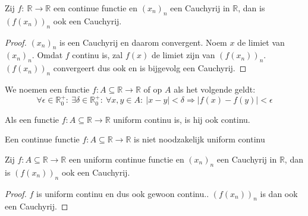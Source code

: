 \documentclass[main.tex]{subfiles}
\begin{document}
\begin{st}
  \label{st:continue-functie-behoudt-cauchy}
  Zij $f:\ \mathbb{R} \rightarrow \mathbb{R}$ een continue functie en $(x_{n})_{n}$ een Cauchyrij in $\mathbb{R}$, dan is $(f(x_{n}))_{n}$ ook een Cauchyrij.

  \begin{proof}
    $(x_{n})_{n}$ is een Cauchyrij en daarom convergent.
    Noem $x$ de limiet van $(x_{n})_{n}$.
    Omdat $f$ continu is, zal $f(x)$ de limiet zijn van $(f(x_{n}))_{n}$.
    $(f(x_{n}))_{n}$ convergeert dus ook en is bijgevolg een Cauchyrij.
  \end{proof}
\end{st}

\begin{de}
  We noemen een functie $f: A \subseteq \mathbb{R} \rightarrow \mathbb{R}$  of  op $A$ als het volgende geldt:
  \[ \forall \epsilon \in \mathbb{R}_{0}^{+}:\ \exists \delta \in \mathbb{R}_{0}^{+}:\ \forall x,y \in A:\ |x-y| < \delta \Rightarrow |f(x)-f(y)| < \epsilon \]
\end{de}

\begin{st}
  \label{st:uniform-continu-dan-ook-gewoon-continu}
  Als een functie $f: A \subseteq \mathbb{R} \rightarrow \mathbb{R}$ uniform continu is, is hij ook continu.
\end{st}

\begin{tvb}
  Een continue functie $f: A \subseteq \mathbb{R} \rightarrow \mathbb{R}$ is niet noodzakelijk uniform continu
\end{tvb}

\begin{pr}
  \label{pr:uniform-continue-functie-behoudt-cauchy}
  Zij $f: A \subseteq \mathbb{R} \rightarrow \mathbb{R}$ een uniform continue functie en $(x_{n})_{n}$ een Cauchyrij in $\mathbb{R}$, dan is $(f(x_{n}))_{n}$ ook een Cauchyrij.

  \begin{proof}
    $f$ is uniform continu en dus ook gewoon continu..
    $(f(x_{n}))_{n}$ is dan ook een Cauchyrij.
  \end{proof}
\end{pr}
\end{document}
